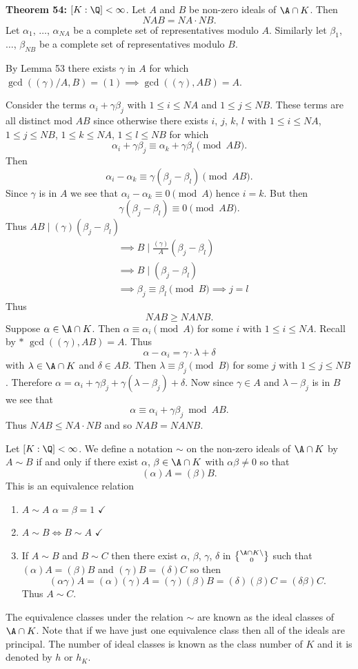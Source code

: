 \textbf{Theorem 54:} $[K:\Q]<\infty$.  Let $A$ and $B$ be non-zero ideals of $\A\cap K$.  Then
\[ NAB = NA\cdot NB . \]
\pf Let $\alpha_1$, $\dotsc$, $\alpha_{NA}$ be a complete set of representatives modulo $A$.  Similarly let $\beta_1$, $\dotsc$, $\beta_{NB}$ be a complete set of representatives modulo $B$.

By Lemma 53 there exists $\gamma$ in $A$ for which $\gcd((\gamma)/A,B)=(1)\implies\gcd((\gamma),AB)=A$.

Consider the terms $\alpha_i+\gamma\beta_j$ with $1\leq i\leq NA$ and $1\leq j\leq NB$.  These terms are all distinct mod $AB$ since otherwise there exists %
$i$, $j$, $k$, $l$ with $1\leq i\leq NA$, $1\leq j\leq NB$, $1\leq k\leq NA$, $1\leq l\leq NB$ for which
\[ \alpha_i + \gamma\beta_j \equiv \alpha_k + \gamma\beta_l \pmod{AB} . \]
Then
\[ \alpha_i - \alpha_k \equiv \gamma(\beta_j-\beta_l) \pmod{AB} . \]
Since $\gamma$ is in $A$ we see that $\alpha_i-\alpha_k\equiv0\pmod{A}$ hence $i=k$.  But then
\[ \gamma(\beta_j-\beta_l) \equiv 0 \pmod{AB} . \]
Thus $AB\mid(\gamma)(\beta_j-\beta_l)$
\begin{align*}
&\implies B \mid \frac{(\gamma)}{A}(\beta_j-\beta_l) \\
&\implies B \mid (\beta_j-\beta_l) \\
&\implies \beta_j \equiv \beta_l \pmod{B} \implies j=l
\end{align*}
Thus
\[ NAB \geq NANB . \]
Suppose $\alpha\in\A\cap K$.  Then $\alpha\equiv\alpha_i\pmod{A}$ for some $i$ with $1\leq i\leq NA$.  Recall by $*$ $\gcd((\gamma),AB)=A$.  Thus
\[ \alpha - \alpha_i = \gamma \cdot \lambda + \delta \]
with $\lambda\in\A\cap K$ and $\delta\in AB$.  Then $\lambda\equiv\beta_j\pmod{B}$ for some $j$ with $1\leq j\leq NB$.  Therefore $\alpha=\alpha_i+\gamma\beta_j+\gamma(\lambda-\beta_j)+\delta$.  Now since $\gamma\in A$ and $\lambda-\beta_j$ is in $B$ we see that
\[ \alpha \equiv \alpha_i + \gamma \beta_j \bmod{AB} . \]
Thus $NAB\leq NA\cdot NB$ and so $NAB=NANB$.

Let $[K:\Q]<\infty$.  We define a notation $\sim$ on the non-zero ideals of $\A\cap K$ by $A\sim B$ if and only if there exist $\alpha$, $\beta\in\A\cap K$ with $\alpha\beta\neq0$ so that
\[ (\alpha)A = (\beta)B . \]
This is an equivalence relation
\begin{enumerate}
\item $A\sim A$ \quad $\alpha=\beta=1$ $\checkmark$
\item $A\sim B\iff B\sim A$ $\checkmark$
\item If $A\sim B$ and $B\sim C$ then there exist %
$\alpha$, $\beta$, $\gamma$, $\delta$ in $\A\cap K\setminus\brace{0}$ such that $(\alpha)A=(\beta)B$ and $(\gamma)B=(\delta)C$ so then
\[ (\alpha\gamma)A = (\alpha)(\gamma)A = (\gamma)(\beta)B = (\delta)(\beta)C = (\delta\beta)C . \]
Thus $A\sim C$.
\end{enumerate}
The equivalence classes under the relation $\sim$ are known as the ideal classes of $\A\cap K$.  Note that if we have just one equivalence class then all of the ideals are principal.  The number of ideal classes is known as the class number of $K$ and it is denoted by $h$ or $h_K$.

